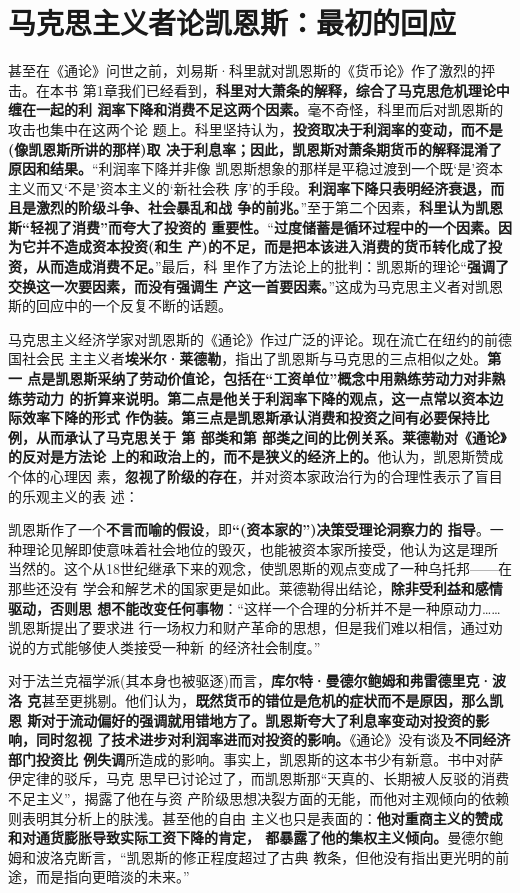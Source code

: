 \section{马克思主义者论凯恩斯：最初的回应}
甚至在《通论》问世之前，刘易斯·科里就对凯恩斯的《货币论》作了激烈的抨击。在本书
第1章我们已经看到，\textbf{科里对大萧条的解释，综合了马克思危机理论中缠在一起的利
  润率下降和消费不足这两个因素。}毫不奇怪，科里而后对凯恩斯的攻击也集中在这两个论
题上。科里坚持认为，\textbf{投资取决于利润率的变动，而不是(像凯恩斯所讲的那样)取
  决于利息率；因此，凯恩斯对萧条期货币的解释混淆了原因和结果。}“利润率下降并非像
凯恩斯想象的那样是平稳过渡到一个既‘是’资本主义而又‘不是’资本主义的‘新社会秩
序’的手段。\textbf{利润率下降只表明经济衰退，而且是激烈的阶级斗争、社会暴乱和战
  争的前兆。}”至于第二个因素，\textbf{科里认为凯恩斯“轻视了消费”而夸大了投资的
  重要性。}“\textbf{过度储蓄是循环过程中的一个因素。因为它并不造成资本投资(和生
  产)的不足，而是把本该进入消费的货币转化成了投资，从而造成消费不足。}”最后，科
里作了方法论上的批判：凯恩斯的理论“\textbf{强调了交换这一次要因素，而没有强调生
  产这一首要因素。}”这成为马克思主义者对凯恩斯的回应中的一个反复不断的话题。

马克思主义经济学家对凯恩斯的《通论》作过广泛的评论。现在流亡在纽约的前德国社会民
主主义者\textbf{埃米尔·莱德勒}，指出了凯恩斯与马克思的三点相似之处。\textbf{第一
  点是凯恩斯采纳了劳动价值论，包括在“工资单位”概念中用熟练劳动力对非熟练劳动力
  的折算来说明。第二点是他关于利润率下降的观点，这一点常以资本边际效率下降的形式
  作伪装。第三点是凯恩斯承认消费和投资之间有必要保持比例，从而承认了马克思关于
  第 部类和第 部类之间的比例关系。莱德勒对《通论》的反对是方法论
  上的和政治上的，而不是狭义的经济上的。}他认为，凯恩斯赞成个体的心理因
素，\textbf{忽视了阶级的存在}，并对资本家政治行为的合理性表示了盲目的乐观主义的表
述：

凯恩斯作了一个\textbf{不言而喻的假设}，即\textbf{“(资本家的”)决策受理论洞察力的
  指导}。一种理论见解即使意味着社会地位的毁灭，也能被资本家所接受，他认为这是理所
当然的。这个从18世纪继承下来的观念，使凯恩斯的观点变成了一种乌托邦——在那些还没有
学会和解艺术的国家更是如此。莱德勒得出结论，\textbf{除非受利益和感情驱动，否则思
  想不能改变任何事物}：“这样一个合理的分析并不是一种原动力……凯恩斯提出了要求进
行一场权力和财产革命的思想，但是我们难以相信，通过劝说的方式能够使人类接受一种新
的经济社会制度。”

对于法兰克福学派(其本身也被驱逐)而言，\textbf{库尔特·曼德尔鲍姆和弗雷德里克·波洛
  克}甚至更挑剔。他们认为，\textbf{既然货币的错位是危机的症状而不是原因，那么凯恩
  斯对于流动偏好的强调就用错地方了。凯恩斯夸大了利息率变动对投资的影响，同时忽视
  了技术进步对利润率进而对投资的影响。}《通论》没有谈及\textbf{不同经济部门投资比
  例失调}所造成的影响。事实上，凯恩斯的这本书少有新意。书中对萨伊定律的驳斥，马克
思早已讨论过了，而凯恩斯那“天真的、长期被人反驳的消费不足主义”，揭露了他在与资
产阶级思想决裂方面的无能，而他对主观倾向的依赖则表明其分析上的肤浅。甚至他的自由
主义也只是表面的：\textbf{他对重商主义的赞成和对通货膨胀导致实际工资下降的肯定，
  都暴露了他的集权主义倾向。}曼德尔鲍姆和波洛克断言，“凯恩斯的修正程度超过了古典
教条，但他没有指出更光明的前途，而是指向更暗淡的未来。”

